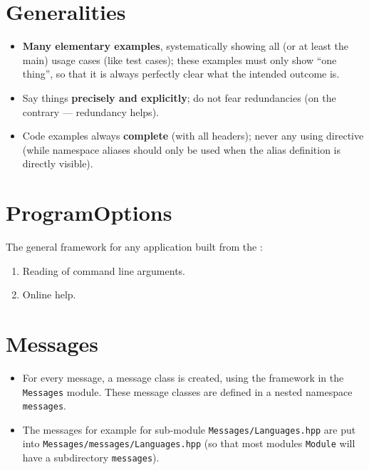 \documentclass{book}
\newcommand{\filename}[1]{\texttt{#1}}
\begin{document}
\section{Generalities}
\label{sec:DocumentationGeneralities}

\begin{itemize}
\item \textbf{Many elementary examples}, systematically showing all (or at least the main) usage cases (like test cases); these examples must only show ``one thing'', so that it is always perfectly clear what the intended outcome is.
\item Say things \textbf{precisely and explicitly}; do not fear redundancies (on the contrary --- redundancy helps).
\item Code examples always \textbf{complete} (with all headers); never any using directive (while namespace aliases should only be used when the alias definition is directly visible).
\end{itemize}




\section{ProgramOptions}
\label{sec:DocumentationProgramOptions}

The general framework for any application built from the \OKlibrary:
\begin{enumerate}
\item Reading of command line arguments.
\item Online help.
\end{enumerate}




\section{Messages}
\label{sec:DocumentationMessages}

\begin{itemize}
\item For every message, a message class is created, using the framework in the \texttt{Messages} module. These message classes are defined in a nested namespace \texttt{messages}.
\item The messages for example for sub-module \filename{Messages/Languages.hpp} are put into \filename{Messages/messages/Languages.hpp} (so that most modules \filename{Module} will have a subdirectory \filename{messages}).
\end{itemize}
\end{document}

